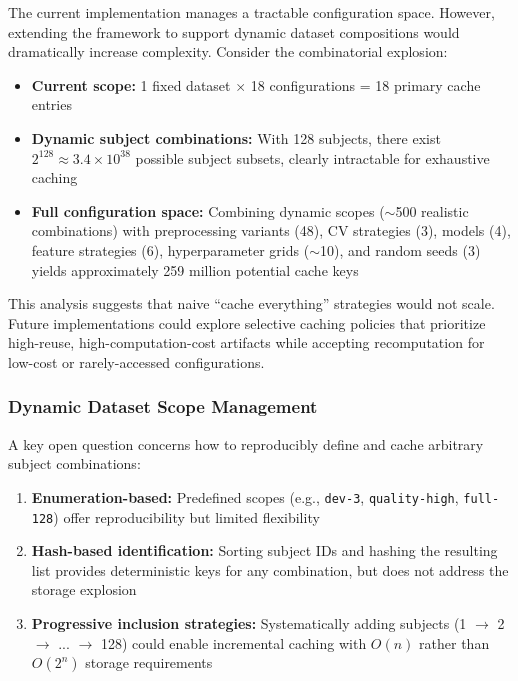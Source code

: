 \documentclass{imc-inf} %
\begin{document}
The current implementation manages a tractable configuration space. However, extending the framework to support dynamic dataset compositions would dramatically increase complexity. Consider the combinatorial explosion:

\begin{itemize}
\item \textbf{Current scope:} 1 fixed dataset $\times$ 18 configurations = 18 primary cache entries
\item \textbf{Dynamic subject combinations:} With 128 subjects, there exist $2^{128} \approx 3.4 \times 10^{38}$ possible subject subsets, clearly intractable for exhaustive caching
\item \textbf{Full configuration space:} Combining dynamic scopes ($\sim$500 realistic combinations) with preprocessing variants (48), CV strategies (3), models (4), feature strategies (6), hyperparameter grids ($\sim$10), and random seeds (3) yields approximately 259 million potential cache keys
\end{itemize}

This analysis suggests that naive ``cache everything'' strategies would not scale. Future implementations could explore selective caching policies that prioritize high-reuse, high-computation-cost artifacts while accepting recomputation for low-cost or rarely-accessed configurations.

\subsubsection{Dynamic Dataset Scope Management}

A key open question concerns how to reproducibly define and cache arbitrary subject combinations:

\begin{enumerate}
\item \textbf{Enumeration-based:} Predefined scopes (e.g., \texttt{dev-3}, \texttt{quality-high}, \texttt{full-128}) offer reproducibility but limited flexibility
\item \textbf{Hash-based identification:} Sorting subject IDs and hashing the resulting list provides deterministic keys for any combination, but does not address the storage explosion
\item \textbf{Progressive inclusion strategies:} Systematically adding subjects (1 $\rightarrow$ 2 $\rightarrow$ ... $\rightarrow$ 128) could enable incremental caching with $O(n)$ rather than $O(2^n)$ storage requirements
\end{enumerate}
\end{document}
